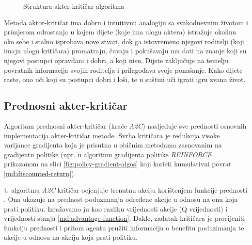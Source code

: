 \begin{figure}[H]
    \centering
    \caption{Struktura akter-kritičar algoritma \cite{ac-arch}}
    \label{fig:actor-critic}
\end{figure}

Metoda aktor-kritičar ima dobru i intuitivnu analogiju sa svakodnevnim životom i primjerom odrastanja u kojem dijete (koje ima ulogu aktera) istražuje okolinu oko sebe i stalno isprobava nove stvari, dok ga istovremeno njegovi roditelji (koji imaju ulogu kritičara) promatraju, čuvaju i pokušavaju mu dati na znanje koji su njegovi postupci opravdani i dobri, a koji nisu. Dijete zaključuje na temelju povratnih informacija svojih roditelja i prilagođava svoje ponašanje. Kako dijete raste, ono uči koji su postupci dobri i loši, te u suštini uči igrati igru zvanu život.

\subsection{Prednosni akter-kritičar}

Algoritam prednosni akter-kritičar  (kraće \textit{A2C}) nasljeđuje sve prednosti osnovnih implementacija akter-kritičar metode. Svrha kritičara je redukcija visoke varijance gradijenta koja je prisutna u običnim metodama zasnovanim na gradijentu politike (npr. u algoritmu gradijenta politike \textit{REINFORCE} prikazanom na slici \ref{fig:policy-gradient-algos} koji koristi kumulativni povrat \ref{md:discounted-return}). 

U algoritmu \textit{A2C} kritičar ocjenjuje trenutnu akciju korištenjem funkcije prednosti . Ona ukazuje na prednost poduzimanja određene akcije u odnosu na onu koja prati politiku. Izražavamo ju kao razliku vrijednosti akcije (Q vrijednosti) i vrijednosti stanja \ref{md:advantage-function}. Dakle, zadatak kritičara je procijeniti funkciju prednosti i pritom agentu pružiti informaciju o benefitu poduzimanja te akcije u odnosu na akciju koja prati politiku.

